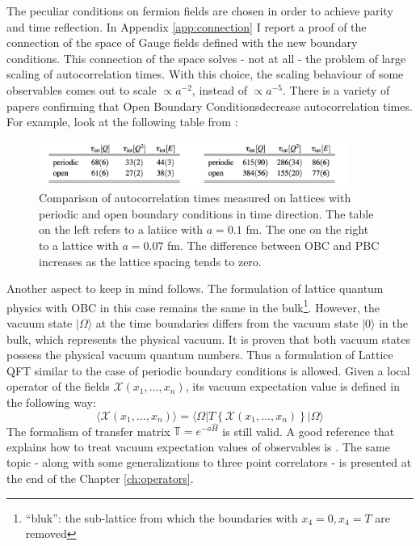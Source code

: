 \documentclass[english, LaM, oneside, noexaminfo]{sapthesis}
\newcommand{\la}{\langle}
\newcommand{\ra}{\rangle}
\newcommand{\obc}{Open Boundary Conditions}
\begin{document}
The peculiar conditions on fermion fields are chosen in order to achieve parity and time reflection.
In Appendix \ref{app:connection} I report a proof of the connection of the space of Gauge fields defined with the new boundary conditions.
This connection of the space solves - not at all - the problem of large scaling of autocorrelation times.
With this choice, the scaling behaviour of some observables comes out to scale $\propto a^{-2}$, instead of $\propto a^{-5}$.
There is a variety of papers confirming that \obc\space decrease autocorrelation times.
For example, look at the following table from \cite{Topology-WilsonFlow-HMC}:
\begin{figure}[h!]
    \centering
    \includegraphics[width=0.9\textwidth]{imgs-MSc-thesis/autocorrelation.png}
    \caption{Comparison of autocorrelation times measured on lattices with periodic and open boundary conditions in time direction.
    The table on the left refers to a latiice with $a=0.1$ fm. The one on the right to a lattice with $a=0.07$ fm. The difference between OBC and PBC increases as the lattice spacing tends to zero. \cite{Topology-WilsonFlow-HMC}}
    \label{tab:autocorrelation-times}
\end{figure}
\newline
Another aspect to keep in mind follows.
The formulation of lattice quantum physics with OBC in this case remains the same in the bulk\footnote{``bluk'': the sub-lattice from which the boundaries with $x_4 = 0, x_4 = T$ are removed}.
However, the vacuum state $|\Omega\ra$ at the time boundaries differs from the vacuum state $|0\ra$ in the bulk, which represents the physical vacuum.
It is proven \cite{OBC_top} that both vacuum states possess the physical vacuum quantum numbers.
Thus a formulation of Lattice QFT similar to the case of periodic boundary conditions is allowed.
Given a local operator of the fields $\mathcal{X}(x_1,\dots,x_n)$, its vacuum expectation value is defined in the following way:
\begin{equation*}
    \la \mathcal{X}(x_1,\dots,x_n) \ra = \la \Omega | T \left\{ \mathcal{X}(x_1,\dots,x_n) \right\} | \Omega \ra
\end{equation*}
The formalism of transfer matrix $\mathbb{T} = e^{-a\hat H}$ is still valid.
A good reference that explains how to treat vacuum expectation values of observables is \cite{ExtractionSpectralQuantities}.
The same topic - along with some generalizations to three point correlators - is presented at the end of the Chapter \ref{ch:operators}.
\end{document}
